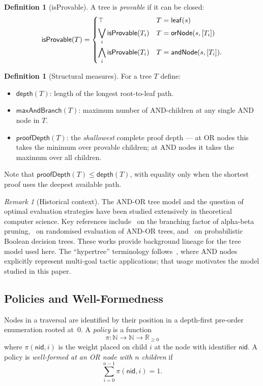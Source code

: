\documentclass[reqno,11pt]{amsart}
\newcommand{\NN}{\mathbb{N}}
\newcommand{\Rnn}{\mathbb{R}_{\ge 0}}
\newcommand{\leafN}{\mathsf{leaf}}
\newcommand{\orN}{\mathsf{orNode}}
\newcommand{\andN}{\mathsf{andNode}}
\newcommand{\isProvable}{\mathsf{isProvable}}
\newcommand{\depth}{\mathsf{depth}}
\newcommand{\maxAnd}{\mathsf{maxAndBranch}}
\newcommand{\proofDepth}{\mathsf{proofDepth}}
\newcommand{\nid}{\mathsf{nid}}
\theoremstyle{plain}
\theoremstyle{definition}
\newtheorem{definition}[theorem]{Definition}
\theoremstyle{remark}
\newtheorem{remark}[theorem]{Remark}
\begin{document}
\begin{definition}[isProvable]
A tree is \emph{provable} if it can be closed:
\[
\isProvable(T) = \begin{dcases}
\top & T = \leafN(s)\\
\bigvee_i \isProvable(T_i) & T = \orN(s, [T_i])\\
\bigwedge_i \isProvable(T_i) & T = \andN(s, [T_i]).
\end{dcases}
\]
\end{definition}

\begin{definition}[Structural measures]
For a tree $T$ define:
\begin{itemize}[leftmargin=*]
\item $\depth(T)$: length of the longest root-to-leaf path.
\item $\maxAnd(T)$: maximum number of AND-children at any single AND node in $T$.
\item $\proofDepth(T)$: the \emph{shallowest} complete proof depth --- at OR nodes this takes the minimum over provable children; at AND nodes it takes the maximum over all children.
\end{itemize}
\end{definition}

Note that $\proofDepth(T) \le \depth(T)$, with equality only when the shortest proof uses the deepest available path.

\begin{remark}[Historical context]
The AND-OR tree model and the question of optimal evaluation strategies have been studied extensively in theoretical computer science. Key references include~\citet{Pearl1982} on the branching factor of alpha-beta pruning,~\citet{Tarsi1983} on randomised evaluation of AND-OR trees, and~\citet{SaksWigderson1986} on probabilistic Boolean decision trees. These works provide background lineage for the tree model used here. The ``hypertree'' terminology follows~\citet{Lample2022}, where AND nodes explicitly represent multi-goal tactic applications; that usage motivates the model studied in this paper.
\end{remark}

\subsection{Policies and Well-Formedness}

Nodes in a traversal are identified by their position in a depth-first pre-order enumeration rooted at~$0$. A \emph{policy} is a function
\[
\pi : \NN \to \NN \to \Rnn
\]
where $\pi(\nid, i)$ is the weight placed on child $i$ at the node with identifier $\nid$. A policy is \emph{well-formed at an OR node with $n$ children} if
\[
\sum_{i=0}^{n-1} \pi(\nid, i) = 1.
\]
\end{document}

